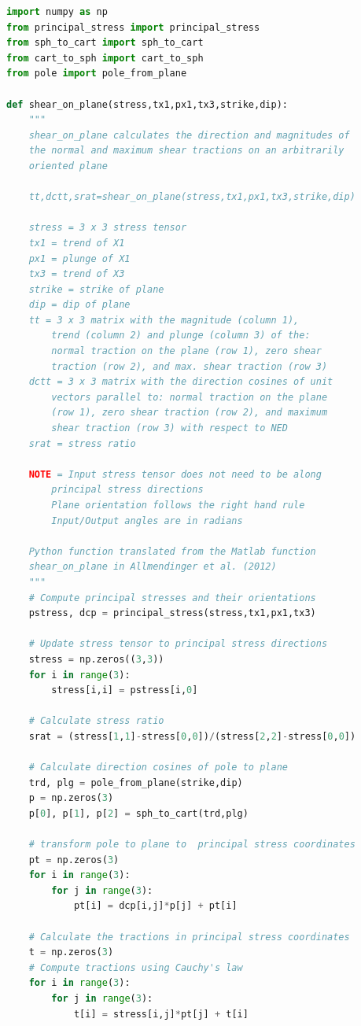 \documentclass[a4paper , 12pt]{book}
\begin{document}
\begin{center}
\begin{lstlisting}[language=Python, frame=single]
import numpy as np
from principal_stress import principal_stress
from sph_to_cart import sph_to_cart
from cart_to_sph import cart_to_sph
from pole import pole_from_plane

def shear_on_plane(stress,tx1,px1,tx3,strike,dip):
	"""
	shear_on_plane calculates the direction and magnitudes of
	the normal and maximum shear tractions on an arbitrarily
	oriented plane
	
	tt,dctt,srat=shear_on_plane(stress,tx1,px1,tx3,strike,dip)
	
	stress = 3 x 3 stress tensor
	tx1 = trend of X1
	px1 = plunge of X1
	tx3 = trend of X3
	strike = strike of plane
	dip = dip of plane
	tt = 3 x 3 matrix with the magnitude (column 1),
		trend (column 2) and plunge (column 3) of the:
		normal traction on the plane (row 1), zero shear
		traction (row 2), and max. shear traction (row 3)
	dctt = 3 x 3 matrix with the direction cosines of unit
		vectors parallel to: normal traction on the plane
		(row 1), zero shear traction (row 2), and maximum
		shear traction (row 3) with respect to NED
	srat = stress ratio
	
	NOTE = Input stress tensor does not need to be along
		principal stress directions
		Plane orientation follows the right hand rule
		Input/Output angles are in radians
	
	Python function translated from the Matlab function
	shear_on_plane in Allmendinger et al. (2012)
	"""
	# Compute principal stresses and their orientations
	pstress, dcp = principal_stress(stress,tx1,px1,tx3)
	
	# Update stress tensor to principal stress directions
	stress = np.zeros((3,3))
	for i in range(3):
		stress[i,i] = pstress[i,0]
	
	# Calculate stress ratio
	srat = (stress[1,1]-stress[0,0])/(stress[2,2]-stress[0,0])
	
	# Calculate direction cosines of pole to plane
	trd, plg = pole_from_plane(strike,dip)
	p = np.zeros(3)
	p[0], p[1], p[2] = sph_to_cart(trd,plg)
	
	# transform pole to plane to  principal stress coordinates
	pt = np.zeros(3)
	for i in range(3):
		for j in range(3):
			pt[i] = dcp[i,j]*p[j] + pt[i]
	
	# Calculate the tractions in principal stress coordinates
	t = np.zeros(3)
	# Compute tractions using Cauchy's law
	for i in range(3):
		for j in range(3):
			t[i] = stress[i,j]*pt[j] + t[i]
	

\end{lstlisting}
\end{center}
\end{document}
